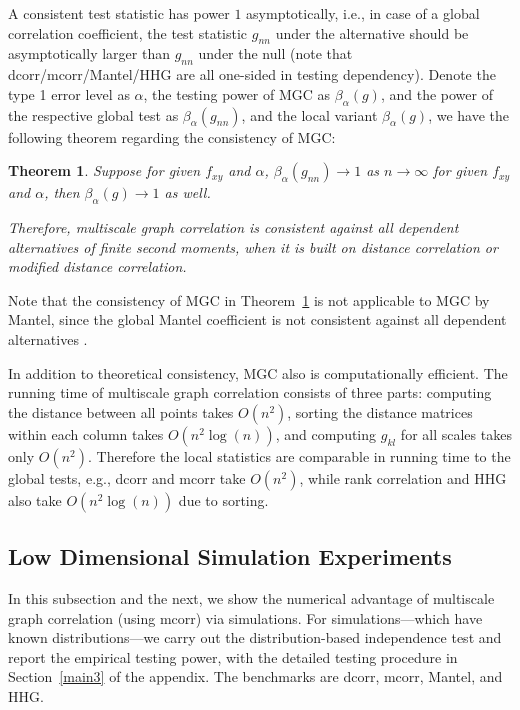 \documentclass[11pt]{article}
\newtheorem{thm}{Theorem}
\begin{document}
A consistent test statistic has power $1$ asymptotically, i.e., in case of a global correlation coefficient, the test statistic $g_{nn}$ under the alternative should be asymptotically larger than $g_{nn}$ under the null (note that dcorr/mcorr/Mantel/HHG are all one-sided in testing dependency). Denote the type 1 error level as $\alpha$, the testing power of MGC as $\beta_{\alpha}(g)$, and the power of the respective global test as $\beta_{\alpha}(g_{nn})$, and the local variant $\beta_{\alpha}(g)$, we have the following theorem regarding the consistency of MGC:
\begin{thm}
\label{thm1}
Suppose for given $f_{xy}$ and $\alpha$, $\beta_{\alpha}(g_{nn}) \rightarrow 1$ as $n \rightarrow \infty$ for given $f_{xy}$ and $\alpha$, then $\beta_{\alpha}(g) \rightarrow 1$ as well.

Therefore, multiscale graph correlation is consistent against all dependent alternatives of finite second moments, when it is built on distance correlation or modified distance correlation.
\end{thm}

Note that the consistency of MGC in Theorem~\ref{thm1} is not applicable to MGC by Mantel, since the global Mantel coefficient is not consistent against all dependent alternatives \cite{JosseHolmes2013}. 

In addition to theoretical consistency, MGC also is computationally efficient. The running time of multiscale graph correlation consists of three parts: computing the distance between all points takes $O(n^2)$, sorting the distance matrices within each column takes $O(n^2\log(n))$, and computing $g_{kl}$ for all scales takes only $O(n^2)$. Therefore the local statistics are comparable in running time to the global tests, e.g., dcorr and mcorr take $O(n^2)$, while rank correlation and HHG also take $O(n^2\log(n))$ due to sorting. 


\subsection{Low Dimensional Simulation Experiments}
\label{numer1}
In this subsection and the next, we show the numerical advantage of multiscale graph correlation (using mcorr) via simulations. For simulations---which have known distributions---we carry out the distribution-based independence test and report the empirical testing power, with the detailed testing procedure in Section~\ref{main3} of the appendix. The benchmarks are dcorr, mcorr, Mantel, and HHG.
\end{document}

